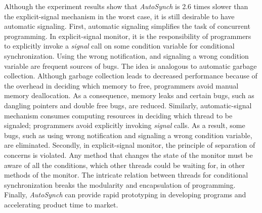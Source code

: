\documentclass{sigplanconf}
\begin{document}
Although the experiment results show that {\em AutoSynch} is 2.6 times slower than 
the explicit-signal mechanism in the worst case, it is still desirable to have automatic signaling.
First, automatic signaling simplifies the task of concurrent programming.
            In explicit-signal monitor, it is the responsibility of programmers to 
        explicitly invoke a {\em signal} call on some condition variable for
        conditional synchronization. Using the wrong notification, and signaling
        a wrong condition variable are frequent sources of bugs.  The idea is analogous to automatic
        garbage collection.
Although garbage collection leads to decreased
performance because of the overhead in deciding which memory to free, programmers 
avoid manual memory deallocation. As a consequence, memory leaks and certain 
bugs, such as dangling pointers and double free bugs, are reduced. 
Similarly, automatic-signal mechanism consumes computing resources 
in deciding which thread to be signaled; programmers avoid explicitly invoking 
{\em signal} calls. As a result, some bugs, such as using wrong notification and
signaling a wrong condition variable, are eliminated.  Secondly,
 in explicit-signal monitor, the principle of separation of concerns is violated.
    Any method that changes the state of the monitor must be aware of all the 
    conditions, which other threads could be waiting for, 
    in other methods of the monitor. 
     The intricate relation between
        threads for conditional synchronization breaks the modularity and 
        encapsulation of programming.  
   Finally,
  {\em AutoSynch} can provide  
        rapid prototyping  in developing programs and accelerating 
        product time to market. 



\end{document}
